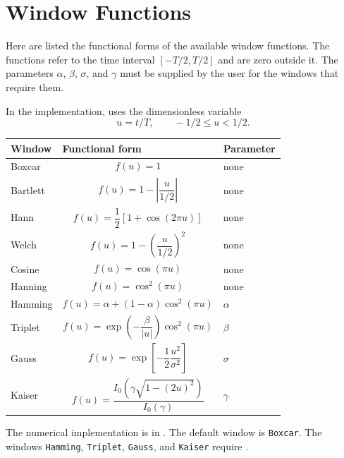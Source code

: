\chapter{Window Functions}
\label{app:window-functions}

Here are listed the functional forms of the available window functions.  The
functions refer to the time interval \([-T/2,T/2]\) and are zero outside it.
The parameters \(\alpha\), \(\beta\), \(\sigma\), and \(\gamma\) must be
supplied by the user for the windows that require them.

In the implementation,  uses the dimensionless variable
\[
  u = t/T ,
  \qquad -1/2 \leq u < 1/2 .
\]

\begin{longtable}{>{\raggedright\arraybackslash}p{}>{\raggedright\arraybackslash}p{}>{\raggedright\arraybackslash}p{}}
\toprule
Window & Functional form & Parameter \\
\midrule
\endhead
Boxcar &
\[
  f(u) = 1
\]
& none \\

Bartlett &
\[
  f(u) = 1 - \left|\frac{u}{1/2}\right|
\]
& none \\

Hann &
\[
  f(u) = \frac{1}{2}\left[1+\cos(2\pi u)\right]
\]
& none \\

Welch &
\[
  f(u) = 1 - \left(\frac{u}{1/2}\right)^2
\]
& none \\

Cosine &
\[
  f(u) = \cos(\pi u)
\]
& none \\

Hanning &
\[
  f(u) = \cos^2(\pi u)
\]
& none \\

Hamming &
\[
  f(u) = \alpha + (1-\alpha)\cos^2(\pi u)
\]
& \(\alpha\) \\

Triplet &
\[
  f(u) = \exp\left(-\frac{\beta}{|u|}\right)\cos^2(\pi u)
\]
& \(\beta\) \\

Gauss &
\[
  f(u) = \exp\left[-\frac{1}{2}\frac{u^2}{\sigma^2}\right]
\]
& \(\sigma\) \\

Kaiser &
\[
  f(u) = \frac{I_0\!\left(\gamma\sqrt{1-(2u)^2}\right)}{I_0(\gamma)}
\]
& \(\gamma\) \\
\bottomrule
\end{longtable}

The numerical implementation is in .  The default
window is \texttt{Boxcar}.  The windows \texttt{Hamming}, \texttt{Triplet},
\texttt{Gauss}, and \texttt{Kaiser} require .
